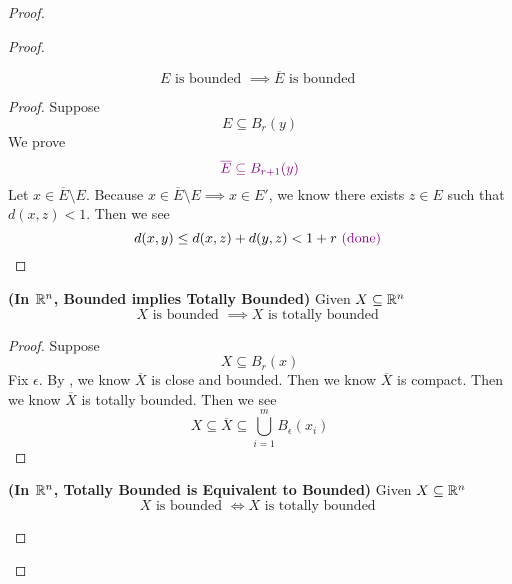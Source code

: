 \documentclass{report}
\begin{document}
\begin{proof}
\begin{proof}
\begin{theorem}
\begin{equation*}
E\text{ is bounded }\implies \overline{E}\text{ is bounded }
\end{equation*}
\end{theorem}
\begin{proof}
Suppose
\begin{equation*}
E\subseteq B_r(y)
\end{equation*}
We prove 
\begin{equation*}
  \textcolor{violet}{\overline{E}\subseteq B_{r+1}(y)}
\end{equation*}
Let $x\in \overline{E}\setminus E$. Because $x\in \overline{E}\setminus E\implies x\in E'$, we know there exists $z\in E$ such that $d(x,z)<1$. Then we see 
\begin{equation*}
d(x,y)\leq d(x,z)+d(y,z)< 1+r \textcolor{violet}{\text{ (done) }}
\end{equation*}
\end{proof}
\begin{theorem}
\label{3.5.4}
\textbf{(In $\mathbb{R}^n$, Bounded implies Totally Bounded)} Given $X\subseteq \mathbb{R}^n$
\begin{equation*}
X\text{ is bounded }\implies X\text{ is totally bounded }
\end{equation*}
\end{theorem}
\begin{proof}
Suppose 
\begin{equation*}
X\subseteq B_r(x)
\end{equation*}
Fix $\epsilon $. By , we know $\overline{X}$ is close and bounded. Then we know $\overline{X}$ is compact. Then we know $\overline{X}$ is totally bounded. Then we see
\begin{equation*}
X\subseteq \overline{X}\subseteq \bigcup_{i=1}^m B_{\epsilon }(x_i)
\end{equation*}
\end{proof}
\begin{corollary}
\label{3.5.5}
\textbf{(In $\mathbb{R}^n$, Totally Bounded is Equivalent to Bounded)}  Given $X\subseteq \mathbb{R}^n$ 
\begin{equation*}
X\text{ is bounded }\iff X\text{ is totally bounded }
\end{equation*}
\end{corollary}


\end{proof}
\end{proof}
\end{document}
